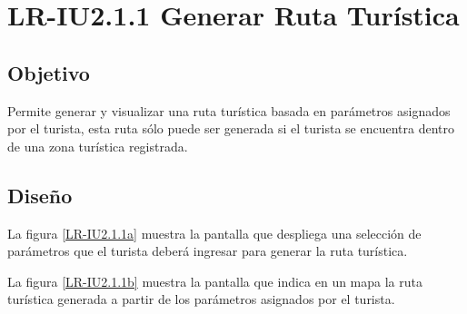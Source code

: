 \newpage
\section{LR-IU2.1.1 Generar Ruta Turística}

\subsection{Objetivo}
Permite generar y visualizar una ruta turística basada en parámetros asignados por el turista, esta ruta sólo puede ser generada si el turista se encuentra dentro de una zona turística registrada.

\subsection{Diseño}
La figura \ref{LR-IU2.1.1a} muestra la pantalla  que despliega una selección de parámetros que el turista deberá ingresar para generar la ruta turística. 


\newpage
La figura \ref{LR-IU2.1.1b} muestra la pantalla  que indica en un mapa la ruta turística generada a partir de los parámetros asignados por el turista.

